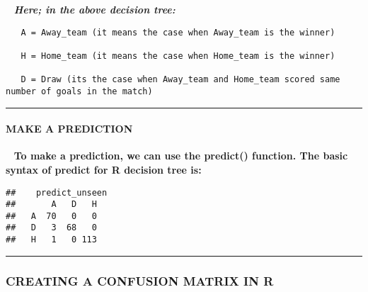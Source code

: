 \documentclass[
]{article}
\newenvironment{Shaded}{\begin{snugshade}}{\end{snugshade}}
\newcommand{\AttributeTok}[1]{\textcolor[rgb]{0.77,0.63,0.00}{#1}}
\newcommand{\CommentTok}[1]{\textcolor[rgb]{0.56,0.35,0.01}{\textit{#1}}}
\newcommand{\FunctionTok}[1]{\textcolor[rgb]{0.00,0.00,0.00}{#1}}
\newcommand{\NormalTok}[1]{#1}
\newcommand{\OtherTok}[1]{\textcolor[rgb]{0.56,0.35,0.01}{#1}}
\newcommand{\SpecialCharTok}[1]{\textcolor[rgb]{0.00,0.00,0.00}{#1}}
\newcommand{\StringTok}[1]{\textcolor[rgb]{0.31,0.60,0.02}{#1}}
\begin{document}
~ \textbf{\emph{Here; in the above decision tree:}}

\begin{verbatim}
   A = Away_team (it means the case when Away_team is the winner)
      
   H = Home_team (it means the case when Home_team is the winner)
      
   D = Draw (its the case when Away_team and Home_team scored same number of goals in the match)
\end{verbatim}

\begin{center}\rule{0.5\linewidth}{0.5pt}\end{center}

\hypertarget{make-a-prediction}{%
\paragraph{\texorpdfstring{\textbf{MAKE A
PREDICTION}}{MAKE A PREDICTION}}\label{make-a-prediction}}

~ \textbf{To make a prediction, we can use the predict() function. The
basic syntax of predict for R decision tree is:}

\begin{Shaded}
\end{Shaded}

\begin{verbatim}
##    predict_unseen
##       A   D   H
##   A  70   0   0
##   D   3  68   0
##   H   1   0 113
\end{verbatim}

\begin{center}\rule{0.5\linewidth}{0.5pt}\end{center}

\hypertarget{creating-a-confusion-matrix-in-r}{%
\subsubsection{\texorpdfstring{\textbf{CREATING A CONFUSION MATRIX IN
R}}{CREATING A CONFUSION MATRIX IN R}}\label{creating-a-confusion-matrix-in-r}}
\end{document}
